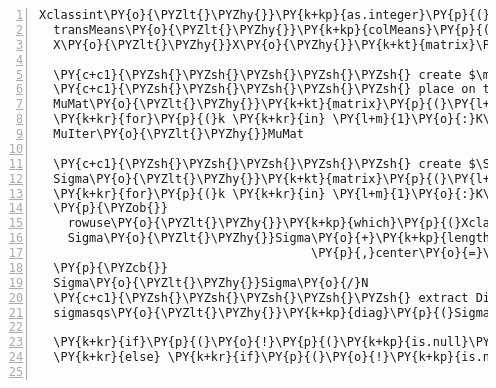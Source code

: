 \begin{Verbatim}[commandchars=\\\{\},codes={\catcode`\$=3\catcode`\^=7\catcode`\_=8},gobble=0,numbers=left,fontfamily=fvm,fontshape=n,fontsize=\footnotesize,tabsize=2]
  Xclassint\PY{o}{\PYZlt{}\PYZhy{}}\PY{k+kp}{as.integer}\PY{p}{(}Xclass\PY{p}{)}
  transMeans\PY{o}{\PYZlt{}\PYZhy{}}\PY{k+kp}{colMeans}\PY{p}{(}X\PY{p}{)}
  X\PY{o}{\PYZlt{}\PYZhy{}}X\PY{o}{\PYZhy{}}\PY{k+kt}{matrix}\PY{p}{(}\PY{k+kp}{rep}\PY{p}{(}transMeans\PY{p}{,}N\PY{p}{)}\PY{p}{,}nrow\PY{o}{=}N\PY{p}{,}byrow\PY{o}{=}\PY{k+kc}{TRUE}\PY{p}{)}

  \PY{c+c1}{\PYZsh{}\PYZsh{}\PYZsh{}\PYZsh{}\PYZsh{} create $\mu_k=\left[\mu_{k1},\hdots,\mu_{kp}\right]$ vectors}
  \PY{c+c1}{\PYZsh{}\PYZsh{}\PYZsh{}\PYZsh{}\PYZsh{} place on top of each other to get KxP matrix}
  MuMat\PY{o}{\PYZlt{}\PYZhy{}}\PY{k+kt}{matrix}\PY{p}{(}\PY{l+m}{0}\PY{p}{,}nrow\PY{o}{=}K\PY{p}{,}ncol\PY{o}{=}P\PY{p}{)}
  \PY{k+kr}{for}\PY{p}{(}k \PY{k+kr}{in} \PY{l+m}{1}\PY{o}{:}K\PY{p}{)} MuMat\PY{p}{[}k\PY{p}{,}\PY{p}{]}\PY{o}{\PYZlt{}\PYZhy{}}\PY{k+kp}{colMeans}\PY{p}{(}X\PY{p}{[}Xclassint\PY{o}{==}k\PY{p}{,}\PY{p}{]}\PY{p}{)}
  MuIter\PY{o}{\PYZlt{}\PYZhy{}}MuMat

  \PY{c+c1}{\PYZsh{}\PYZsh{}\PYZsh{}\PYZsh{}\PYZsh{} create $\Sigma$}
  Sigma\PY{o}{\PYZlt{}\PYZhy{}}\PY{k+kt}{matrix}\PY{p}{(}\PY{l+m}{0}\PY{p}{,}nrow\PY{o}{=}P\PY{p}{,}ncol\PY{o}{=}P\PY{p}{)}
  \PY{k+kr}{for}\PY{p}{(}k \PY{k+kr}{in} \PY{l+m}{1}\PY{o}{:}K\PY{p}{)} 
  \PY{p}{\PYZob{}}
    rowuse\PY{o}{\PYZlt{}\PYZhy{}}\PY{k+kp}{which}\PY{p}{(}Xclassint\PY{o}{==}k\PY{p}{)}
    Sigma\PY{o}{\PYZlt{}\PYZhy{}}Sigma\PY{o}{+}\PY{k+kp}{length}\PY{p}{(}rowuse\PY{p}{)}\PY{o}{*}cov.wt\PY{p}{(}X\PY{p}{[}rowuse\PY{p}{,}\PY{p}{]}\PY{p}{,}cor\PY{o}{=}\PY{k+kc}{FALSE}
                                      \PY{p}{,}center\PY{o}{=}\PY{k+kc}{TRUE}\PY{p}{,}method\PY{o}{=}\PY{l+s}{\PYZdq{}}\PY{l+s}{ML\PYZdq{}}\PY{p}{)}\PY{o}{\PYZdl{}}cov
  \PY{p}{\PYZcb{}}
  Sigma\PY{o}{\PYZlt{}\PYZhy{}}Sigma\PY{o}{/}N
  \PY{c+c1}{\PYZsh{}\PYZsh{}\PYZsh{}\PYZsh{}\PYZsh{} extract Diag elements}
  sigmasqs\PY{o}{\PYZlt{}\PYZhy{}}\PY{k+kp}{diag}\PY{p}{(}Sigma\PY{p}{)}
  
  \PY{k+kr}{if}\PY{p}{(}\PY{o}{!}\PY{p}{(}\PY{k+kp}{is.null}\PY{p}{(}alph\PY{p}{)} \PY{o}{|} \PY{k+kp}{is.null}\PY{p}{(}wts\PY{p}{)}\PY{p}{)}\PY{p}{)} sigmasqs\PY{o}{\PYZlt{}\PYZhy{}}sigmasqs\PY{o}{+}alph\PY{o}{*}wts
  \PY{k+kr}{else} \PY{k+kr}{if}\PY{p}{(}\PY{o}{!}\PY{k+kp}{is.null}\PY{p}{(}alph\PY{p}{)}\PY{p}{)} sigmasqs\PY{o}{\PYZlt{}\PYZhy{}}sigmasqs\PY{o}{+}\PY{k+kp}{rep}\PY{p}{(}alph\PY{p}{,}P\PY{p}{)}
  

\end{Verbatim}

